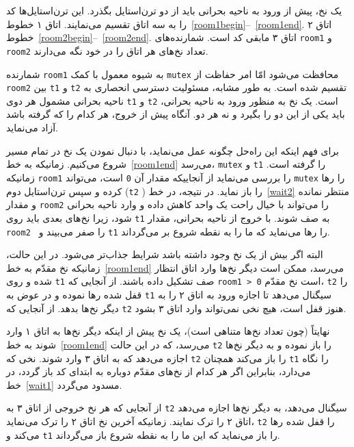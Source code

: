 \documentclass{book}
\begin{document}
    یک نخ، پیش از ورود به ناحیه بحرانی باید از دو ترن‌استایل بگذرد. 
    این ترن‌استایل‌ها کد را به سه اتاق تقسیم می‌نمایند. اتاق ۱ خطوط~\ref{room1begin}--~\ref{room1end}.
    اتاق ۲ خطوط~\ref{room2begin}--~\ref{room2end}. اتاق ۳ مابقی  کد  است. 
    شمارنده‌های {\tt room1} و {\tt room2} تعداد نخ‌های هر اتاق را در خود نگه می‌دارند. 

    شمارنده  {\tt room1}  به شیوه معمول با کمک {\tt mutex} محافظت می‌شود امّا امر حفاظت از {\tt room2} 
    بین {\tt t1} و {\tt t2} تقسیم شده است. به طور مشابه، مسئولیت دسترسی انحصاری به ناحیه بحرانی مشمول هر دوی {\tt t1} و {\tt t2} است. 
    یک نخ به منظور ورود به ناحیه بحرانی،  باید یکی از این دو را بگیرد و نه هر دو. آنگاه پیش از خروج، هر کدام را که گرفته باشد آزاد می‌نماید. 

    برای فهم اینکه این راه‌حل چگونه عمل می‌نماید، با دنبال نمودن یک نخ در تمام مسیر شروع می‌کنیم. 
    زمانیکه به خط~\ref{room1end} می‌رسد، {\tt mutex} و {\tt t1} 
     را گرفته است. زمانیکه {\tt room1}  را بررسی می‌نماید از آنجاییکه مقدار آن {\tt 0} است، 
    می‌تواند {\tt mutex} را رها کرده و سپس ترن‌استایل دوم ({\tt t2} ) را باز نماید. در نتیجه، در خط~\ref{wait2} منتظر نمانده 
    و مقدار {\tt room2} را  می‌تواند  با خیال راحت 
    یک واحد کاهش داده  و وارد ناحیه بحرانی شود، زیرا نخ‌های بعدی باید روی  {\tt t1} به صف شوند. 
    با خروج از ناحیه بحرانی، مقدار  {\tt room2 } را صفر می‌بیند و {\tt t1} را رها می‌نماید که ما را به نقطه شروع بر می‌گرداند. 

    البته اگر بیش از یک نخ وجود داشته باشد شرایط جذاب‌تر می‌شود. 
    در این حالت، زمانیکه نخ مقدّم به خط~\ref{room1end} می‌رسد، ممکن است دیگر نخ‌ها 
    وارد اتاق انتظار شده  و روی  {\tt t1} صف تشکیل داده باشند. از آنجایی که {\tt room1 > 0} است نخ مقدّم، {\tt t2} 
    را قفل شده رها نموده و در عوض به {\tt t1} سیگنال می‌دهد 
    تا اجازه ورود به اتاق ۲ را به دیگر نخ‌ها بدهد. از آنجایی که {\tt t2} هنوز قفل است، هیچ نخی نمی‌تواند وارد اتاق ۳ بشود. 

    نهایتاً (چون تعداد نخ‌ها متناهی است)، یک نخ پیش از اینکه دیگر نخ‌ها به اتاق ۱ وارد شوند به خط~\ref{room1end} می‌رسد، 
    که در این حالت {\tt t2}
    را باز نموده و به دیگر نخ‌ها اجازه می‌دهد که به اتاق ۳ وارد شوند. نخی که  {\tt t2}  را باز می‌کند همچنان  {\tt t1} را نگاه می‌دارد، بنابراین 
    اگر هر کدام از نخ‌های مقدّم دوباره به ابتدای کد باز گردد، در خط~\ref{wait1} مسدود می‌گردد. 

    از آنجایی که هر نخ خروجی از اتاق ۳ به  {\tt t2} سیگنال می‌دهد،  به دیگر نخ‌ها اجازه می‌دهد اتاق ۲ را ترک نمایند. 
    زمانیکه آخرین نخ اتاق ۲ را ترک می‌نماید، {\tt t2}  را قفل شده رها می‌کند و  {\tt t1} را باز می‌نماید که این ما را به نقطه شروع باز می‌گرداند. 
\end{document}
